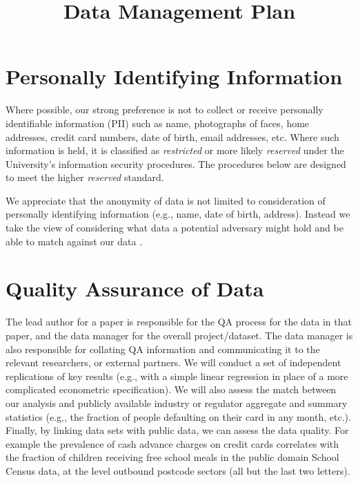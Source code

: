 \documentclass[doc]{apa6}
\title{Data Management Plan}
\begin{document}
\maketitle

\section{Personally Identifying Information}

Where possible, our strong preference is not to collect or receive personally identifiable information (PII) such as name, photographs of faces, home addresses, credit card numbers, date of birth, email addresses, etc. Where such information is held, it is classified as \emph{restricted} or more likely \emph{reserved} under the University's information security procedures. The procedures below are designed to meet the higher \emph{reserved} standard.

We appreciate that the anonymity of data is not limited to consideration of personally identifying information (e.g., name, date of birth, address). Instead we take the view of considering what data a potential adversary might hold and be able to match against our data \cite{LeaseHullmanBighamBernsteinKimLaseckiBakhshiMitraMiller13,deMontjoyeRadaelliSinghPentland15}.

\section{Quality Assurance of Data}

The lead author for a paper is responsible for the QA process for the data in that paper, and the data manager for the overall project/dataset. The data manager is also responsible for collating QA information and communicating it to the relevant researchers, or external partners. We will conduct a set of independent replications of key results (e.g., with a simple linear regression in place of a more complicated econometric specification). We will also assess the match between our analysis and publicly available industry or regulator aggregate and summary statistics (e.g., the fraction of people defaulting on their card in any month, etc.). Finally, by linking data sets with public data, we can assess the data quality. For example the prevalence of cash advance charges on credit cards correlates with the fraction of children receiving free school meals in the public domain School Census data, at the level outbound postcode sectors (all but the last two letters). 
\end{document}
